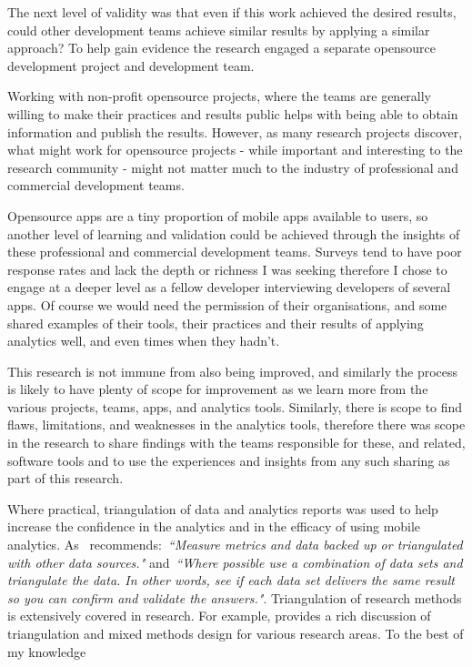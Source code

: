 The next level of validity was that even if this work achieved the desired results, could other development teams achieve similar results by applying a similar approach? To help gain evidence the research engaged a separate opensource development project and development team. 

Working with non-profit opensource projects, where the teams are generally willing to make their practices and results public helps with being able to obtain information and publish the results. However, as many research projects discover, what might work for opensource projects - while important and interesting to the research community - might not matter much to the industry of professional and commercial development teams. 

Opensource apps are a tiny proportion of mobile apps available to users, so another level of learning and validation could be achieved through the insights of these professional and commercial development teams. Surveys tend to have poor response rates and lack the depth or richness I was seeking therefore I chose to engage at a deeper level as a fellow developer interviewing developers of several apps. Of course we would need the permission of their organisations, and some shared examples of their tools, their practices and their results of applying analytics well, and even times when they hadn't.

This research is not immune from also being improved, and similarly the process is likely to have plenty of scope for improvement as we learn more from the various projects, teams, apps, and analytics tools. Similarly, there is scope to find flaws, limitations, and weaknesses in the analytics tools, therefore there was scope in the research to share findings with the teams responsible for these, and related, software tools and to use the experiences and insights from any such sharing as part of this research.

Where practical, triangulation of data and analytics reports was used to help increase the confidence in the analytics and in the efficacy of using mobile analytics. As~\citep{marr2015bigdatabook} recommends:~\emph{``Measure metrics and data backed up or triangulated with other data sources."} and~\emph{``Where possible use a combination of data sets and triangulate the data. In other words, see if each data set delivers the same result so you can confirm and validate the answers."}. Triangulation of research methods is extensively covered in research. For example, \citep{fielding2012_triangulation_and_mixed_methods_designs} provides a rich discussion of triangulation and mixed methods design for various research areas. To the best of my knowledge  %



